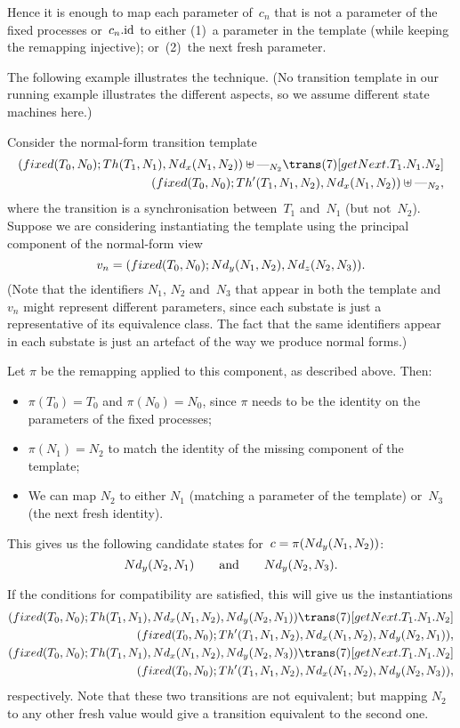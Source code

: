 Hence it is enough to map each parameter of~$c_n$ that is not a parameter of
the fixed processes or~$c_n.\mathrm{id}$ to either (1)~a parameter in the template (while
keeping the remapping injective); or~(2)~the next fresh parameter.

The following example illustrates the technique.  (No transition template in
our running example illustrates the different aspects, so we assume different
state machines here.)
%
\begin{example}
\label{example:template-1}
Consider the normal-form transition template
\[
\begin{align}
(fixed(T_0,N_0); Th(T_1,N_1), \Node_x(N_1,N_2)) \uplus \bighole{N_2}
  \trans(7)[getNext.T_1.N_1.N_2] \\
\qquad
(fixed(T_0,N_0); Th'(T_1,N_1,N_2), \Node_x(N_1,N_2)) \uplus \bighole{N_2},
\end{align}
\]
where the transition is a synchronisation between~$T_1$ and~$N_1$ (but
not~$N_2$). 
Suppose we are considering instantiating the template using the principal
component of the normal-form view
\[
v_n = (fixed(T_0,N_0); Nd_y(N_1,N_2), Nd_z(N_2,N_3)).
\]
(Note that the identifiers $N_1$, $N_2$ and~$N_3$ that appear in both the
template and~$v_n$ might represent different parameters, since each substate
is just a representative of its equivalence class.  The fact that the same
identifiers appear in each substate is just an artefact of the way we produce
normal forms.)

Let $\pi$ be the remapping applied to this component, as described above.
Then:
%
\begin{itemize}
\item  $\pi(T_0) = T_0$ and $\pi(N_0) = N_0$, since $\pi$ needs to be the
identity on the parameters of the fixed processes;

\item $\pi(N_1) = N_2$ to match the identity of the missing component of the
  template;

\item We can map $N_2$ to either $N_1$ (matching a parameter of the template)
  or~$N_3$ (the next fresh identity).
\end{itemize}
%
This gives us the following candidate states for~$c = \pi(Nd_y(N_1,N_2))$:
\[
Nd_y(N_2,N_1) \qquad\mbox{and}\qquad Nd_y(N_2,N_3).
\]

If the conditions for compatibility are satisfied, this will give us the
instantiations
\[
\begin{align}
(fixed(T_0,N_0); Th(T_1,N_1), \Node_x(N_1,N_2), \Node_y(N_2,N_1))
  \trans(7)[getNext.T_1.N_1.N_2] \\
\qquad (fixed(T_0,N_0); Th'(T_1,N_1,N_2), \Node_x(N_1,N_2), \Node_y(N_2,N_1)),
\\
(fixed(T_0,N_0); Th(T_1,N_1), \Node_x(N_1,N_2), \Node_y(N_2,N_3))
  \trans(7)[getNext.T_1.N_1.N_2] \\
\qquad (fixed(T_0,N_0); Th'(T_1,N_1,N_2), \Node_x(N_1,N_2), \Node_y(N_2,N_3)),
\end{align}
\]
respectively.  Note that these two transitions are not equivalent; but mapping
$N_2$ to any other fresh value would give a transition equivalent to the
second one. 
\end{example}

